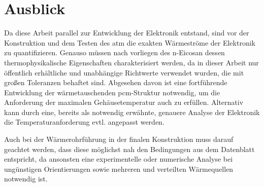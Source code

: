 \chapter{Ausblick}
\label{chap:Ausblick}
\pagestyle{OnlySection}		%

Da diese Arbeit parallel zur Entwicklung der Elektronik entstand, sind vor der Konstruktion und dem Testen des \ac{atm} die exakten
Wärmeströme der Elektronik zu quantifizieren. Genauso müssen nach vorliegen des n-Eicosan dessen thermophysikalische Eigenschaften charakterisiert werden,
da in dieser Arbeit nur öffentlich erhältliche und unabhängige Richtwerte verwendet wurden, die mit großen Toleranzen behaftet sind.
Abgesehen davon ist eine fortführende Entwicklung der wärmetauschenden \ac{pcm}-Struktur notwendig, um die Anforderung der maximalen
Gehäusetemperatur auch zu erfüllen. Alternativ kann durch eine, bereits als notwendig erwähnte, genauere Analyse der Elektronik
die Temperaturanforderung evtl. angepasst werden.

Auch bei der Wärmerohrführung in der finalen Konstruktion muss darauf geachtet werden, dass diese möglichst nah den Bedingungen aus
dem Datenblatt entspricht, da ansonsten eine experimentelle oder numerische Analyse bei ungünstigen Orientierungen sowie mehreren und verteilten Wärmequellen
notwendig ist.